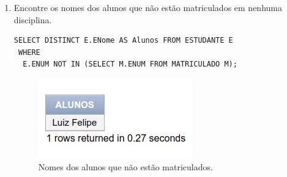 \documentclass[
article,			%
11pt,				%
oneside,			%
a4paper,			%
english,			%
brazil,				%
sumario=tradicional
]{abntex2}
\begin{document}
\begin{enumerate}
\begin{verbatim}
\end{verbatim}

\begin{center}
	\begin{figure}[H]
		\centering
		\caption{}
		\label{rota-1}
	\end{figure}
\end{center}
	\item Encontre os nomes dos alunos que não estão matriculados em nenhuma disciplina.
\begin{verbatim}
SELECT DISTINCT E.ENome AS Alunos FROM ESTUDANTE E
 WHERE
  E.ENUM NOT IN (SELECT M.ENUM FROM MATRICULADO M);
\end{verbatim}

\begin{center}
	\begin{figure}[H]
		\centering
			\includegraphics[scale=0.8]{./imagens/at-14.png}
		\caption{Nomes dos alunos que não estão matriculados.}
		\label{rota-1}
	\end{figure}
\end{center}
	\end{enumerate}
	
\end{document}

